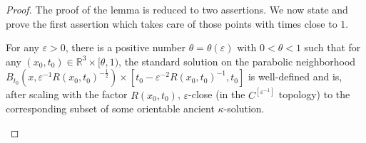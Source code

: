 \begin{proof}
The proof of the lemma is reduced to two assertions. We now state
and prove the first assertion which takes care of those points
with times close to $1$.

\begin{proposition}
  \label{prop:cz-standard-solution-late-time-ancient-model}

For any $\varepsilon>0$, there is a positive number
$\theta=\theta(\varepsilon)$ with $0<\theta<1$ such that for any
$(x_0,t_0)\in \mathbb{R}^3\times [\theta,1)$, the standard
solution on the parabolic neighborhood
$B_{t_0}(x,\varepsilon^{-1}R(x_0,t_0)^{-\frac{1}{2}}) \times
[t_0-\varepsilon^{-2}R(x_0,t_0)^{-1},t_0]$ is well-defined and is,
after scaling with the factor $R(x_0,t_0)$, $\varepsilon$-close
(in the $C^{[\varepsilon^{-1}]}$ topology) to the corresponding
subset of some orientable ancient $\kappa$-solution.
\end{proposition}


\end{proof}
